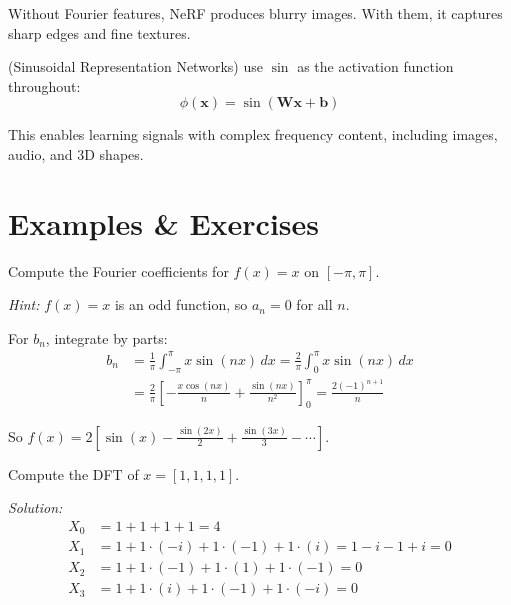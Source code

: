 Without Fourier features, NeRF produces blurry images. With them, it captures sharp edges and fine textures.

 (Sinusoidal Representation Networks) use $\sin$ as the activation function throughout:
\begin{equation}
    \phi(\mathbf{x}) = \sin(\mathbf{W}\mathbf{x} + \mathbf{b})
\end{equation}

This enables learning signals with complex frequency content, including images, audio, and 3D shapes.





\newpage
\section{Examples \& Exercises}


 Compute the Fourier coefficients for $f(x) = x$ on $[-\pi, \pi]$.

\textit{Hint:} $f(x) = x$ is an odd function, so $a_n = 0$ for all $n$.

For $b_n$, integrate by parts:
\begin{align*}
    b_n &= \frac{1}{\pi} \int_{-\pi}^{\pi} x \sin(nx) \, dx = \frac{2}{\pi} \int_0^{\pi} x \sin(nx) \, dx \\
    &= \frac{2}{\pi} \left[-\frac{x \cos(nx)}{n} + \frac{\sin(nx)}{n^2}\right]_0^{\pi} = \frac{2(-1)^{n+1}}{n}
\end{align*}

So $f(x) = 2\left[\sin(x) - \frac{\sin(2x)}{2} + \frac{\sin(3x)}{3} - \cdots\right]$.


\vspace{2em}
 Compute the DFT of $x = [1, 1, 1, 1]$.

\textit{Solution:}
\begin{align*}
    X_0 &= 1 + 1 + 1 + 1 = 4 \\
    X_1 &= 1 + 1 \cdot (-i) + 1 \cdot (-1) + 1 \cdot (i) = 1 - i - 1 + i = 0 \\
    X_2 &= 1 + 1 \cdot (-1) + 1 \cdot (1) + 1 \cdot (-1) = 0 \\
    X_3 &= 1 + 1 \cdot (i) + 1 \cdot (-1) + 1 \cdot (-i) = 0
\end{align*}

